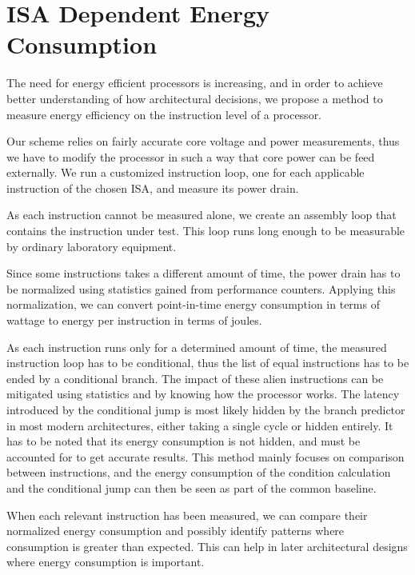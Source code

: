 \section{ISA Dependent Energy Consumption}

The need for energy efficient processors is increasing, and in order to achieve
better understanding of how architectural decisions, we propose a method to
measure energy efficiency on the instruction level of a processor.

Our scheme relies on fairly accurate core voltage and power measurements, thus
we have to modify the processor in such a way that core power can be feed
externally.  We run a customized instruction loop, one for each applicable
instruction of the chosen ISA, and measure its power drain.

As each instruction cannot be measured alone, we create an assembly loop that
contains the instruction under test. This loop runs long enough to be measurable
by ordinary laboratory equipment.

Since some instructions takes a different amount of time, the power drain has to be
normalized using statistics gained from performance counters. Applying this
normalization, we can convert point-in-time energy consumption in terms of
wattage to energy per instruction in terms of joules.

As each instruction runs only for a determined amount of time, the measured
instruction loop has to be conditional, thus the list of equal instructions has
to be ended by a conditional branch. The impact of these alien instructions
can be mitigated using statistics and by knowing how the processor works. The
latency introduced by the conditional jump is most likely hidden by the branch
predictor in most modern architectures, either taking a single cycle or hidden
entirely. It has to be noted that its energy consumption is not hidden, and must
be accounted for to get accurate results. This method mainly focuses on
comparison between instructions, and the energy consumption of the condition
calculation and the conditional jump can then be seen as part of the common
baseline.

When each relevant instruction has been measured, we can compare their
normalized energy consumption and possibly identify patterns where consumption
is greater than expected. This can help in later architectural designs where
energy consumption is important.


